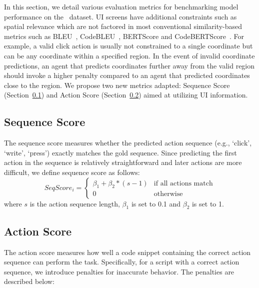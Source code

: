 In this section, we detail various evaluation metrics for benchmarking model performance on the \ModelName\ dataset. UI screens have additional constraints such as spatial relevance which are not factored in most conventional similarity-based metrics such as BLEU~\cite{papineni2002bleu}, CodeBLEU~\cite{ren2020codebleu}, BERTScore \cite{zhang2020bertscore} and CodeBERTScore~\cite{zhou2023codebertscore}. For example, a valid click action is usually not constrained to a single coordinate but can be any coordinate within a specified region. In the event of invalid coordinate predictions, an agent that predicts coordinates further away from the valid region should invoke a higher penalty compared to an agent that predicted coordinates close to the region. We propose two new metrics adapted: Sequence Score (Section~\ref{sec:sequence_score}) and Action Score (Section~\ref{sec:action_score}) aimed at utilizing UI information. 

\subsection{Sequence Score}  \label{sec:sequence_score}
The sequence score measures whether the predicted action sequence (e.g., `click', `write', `press') exactly matches the gold sequence. Since predicting the first action in the sequence is relatively straightforward and later actions are more difficult, we define sequence score as follows: \setlength{\abovedisplayskip}{3pt}
\setlength{\belowdisplayskip}{3pt}
\begin{equation}
SeqScore_i = 
    \begin{cases}
        \beta_1 + \beta_2 * (s-1) & \text{if all actions match} \\
        0 & \text{otherwise}
    \end{cases}
\end{equation}
where $s$ is the action sequence length, $\beta_1$ is set to 0.1 and $\beta_2$ is set to 1.
\subsection{Action Score}  \label{sec:action_score}
The action score measures how well a code snippet containing the correct action sequence can perform the task. Specifically, for a script with a correct action sequence, we introduce penalties for inaccurate behavior. The penalties are described below:


